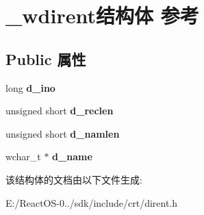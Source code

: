 \hypertarget{struct__wdirent}{}\section{\+\_\+wdirent结构体 参考}
\label{struct__wdirent}
\subsection*{Public 属性}
\begin{DoxyCompactItemize}
\item 
\mbox{\label{struct__wdirent_ac8cfaf294a0b6a49287d3f384c280c93}} 
long {\bfseries d\+\_\+ino}
\item 
\mbox{\label{struct__wdirent_aff7f360608e576cd18cf11f2caf13ef3}} 
unsigned short {\bfseries d\+\_\+reclen}
\item 
\mbox{\label{struct__wdirent_a53710fa2d49421878e637d8bdf68973e}} 
unsigned short {\bfseries d\+\_\+namlen}
\item 
\mbox{\label{struct__wdirent_ab01117b8e78df9e9308dd4e28ecf93dc}} 
wchar\+\_\+t $\ast$ {\bfseries d\+\_\+name}
\end{DoxyCompactItemize}


该结构体的文档由以下文件生成\+:\begin{DoxyCompactItemize}
\item 
E\+:/\+React\+O\+S-\/0../sdk/include/crt/dirent.\+h\end{DoxyCompactItemize}
